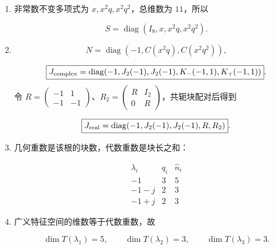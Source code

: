 \documentclass[UTF8,10pt,letterpaper,fontset=fandol]{ctexart}
\begin{document}
\begin{enumerate}
\item 非常数不变多项式为 $x,x^2q,x^2q^2$，总维数为 $11$，所以

\[
\boxed{S=\operatorname{diag}(I_8,x,x^2q,x^2q^2)}.
\]

\item
\[
\boxed{N=\operatorname{diag}(-1,C(x^2q),C(x^2q^2))},
\]

\[
\boxed{J_{\rm complex}=\operatorname{diag}(-1,J_2(-1),J_2(-1),K_-(-1,1),K_+(-1,1))}.
\]
令 $R=\begin{pmatrix}-1&1\\-1&-1\end{pmatrix}$、$R_2=\begin{pmatrix}R&I_2\\0&R\end{pmatrix}$，共轭块配对后得到

\[
\boxed{J_{\rm real}=\operatorname{diag}(-1,J_2(-1),J_2(-1),R,R_2)}.
\]

\item 几何重数是该根的块数，代数重数是块长之和：

\[
\begin{array}{c|cc}\lambda_i&q_i&\widehat n_i\\\hline -1&3&5\\-1-j&2&3\\-1+j&2&3\end{array}
\]

\item 广义特征空间的维数等于代数重数，故

\[
\boxed{\dim T(\lambda_1)=5,\qquad\dim T(\lambda_2)=3,\qquad\dim T(\lambda_3)=3}.
\]

\end{enumerate}
\end{document}
